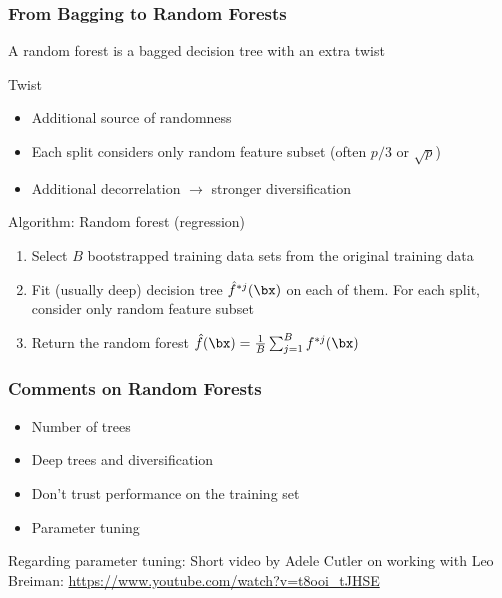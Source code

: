 \begin{frame}
	\frametitle{From Bagging to Random Forests}
	A random forest is a bagged decision tree with an extra twist
	
	\begin{block}{Twist}
		\begin{itemize}
			\item Additional source of randomness
			\item Each split considers only random feature subset (often $p/3$ or $\sqrt p$)
			\item Additional decorrelation $\rightarrow$ stronger diversification
		\end{itemize}
	\end{block}
	
	\begin{block}{Algorithm: Random forest (regression)}
		\begin{enumerate}
			\item Select $B$ bootstrapped training data sets from the original training data
			\item Fit (usually deep) decision tree $\hat f^{*j}(\bx)$ on each of them. For each split, consider only random feature subset
			\item Return the random forest
			$
			\hat f(\bx) = \frac{1}{B} \sum_{j = 1}^B f^{*j}(\bx)
			$
		\end{enumerate}
	\end{block}
\end{frame}

\begin{frame}
	\frametitle{Comments on Random Forests}
	
	\begin{itemize}
		\item Number of trees
		\item Deep trees and diversification 
		\item Don't trust performance on the training set
		\item Parameter tuning
	\end{itemize}
	
	\vfill
	
	Regarding \alert{parameter tuning}: Short video by Adele Cutler on working with Leo Breiman: \url{https://www.youtube.com/watch?v=t8ooi_tJHSE}
	
	\vfill
	
	\begin{example}
	\end{example}
\end{frame}

